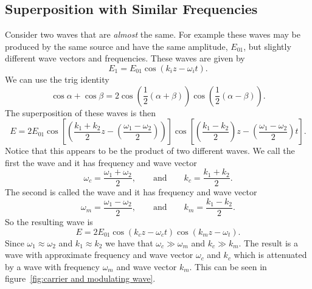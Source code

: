     \subsection{Superposition with Similar Frequencies}
    Consider two waves that are \emph{almost} the same.
    For example these waves may be produced by the same source and have the same amplitude, \(E_{01}\), but slightly different wave vectors and frequencies.
    These waves are given by
    \[E_1 = E_{01}\cos(k_iz - \omega_i t).\]
    We can use the trig identity
    \[\cos\alpha + \cos\beta = 2 \cos\left( \frac{1}{2}(\alpha + \beta) \right)\cos\left( \frac{1}{2}(\alpha - \beta) \right).\]
    The superposition of these waves is then
    \[E = 2E_{01} \cos\left[ \left( \frac{k_1 + k_2}{2}z - \left( \frac{\omega_1 - \omega_2}{2} \right) \right) \right] \cos\left[ \left( \frac{k_1 - k_2}{2} \right)z - \left( \frac{\omega_1 - \omega_2}{2} \right)t \right].\]
    Notice that this appears to be the product of two different waves.
    We call the first the  wave and it has frequency and wave vector
    \[\omega_c = \frac{\omega_1 + \omega_2}{2}, \qquad\text{and}\qquad k_c = \frac{k_1 + k_2}{2}.\]
    The second is called the  wave and it has frequency and wave vector
    \[\omega_m = \frac{\omega_1 - \omega_2}{2}, \qquad\text{and}\qquad k_m = \frac{k_1 - k_2}{2}.\]
    So the resulting wave is
    \[E = 2E_{01}\cos(k_cz - \omega_ct)\cos(k_mz - \omega_t).\]
    Since \(\omega_1 \approx \omega_2\) and \(k_1 \approx k_2\) we have that \(\omega_c \gg \omega_m\) and \(k_c \gg k_m\).
    The result is a wave with approximate frequency and wave vector \(\omega_c\) and \(k_c\) which is attenuated by a wave with frequency \(\omega_m\) and wave vector \(k_m\).
    This can be seen in figure~\ref{fig:carrier and modulating wave}.
    
